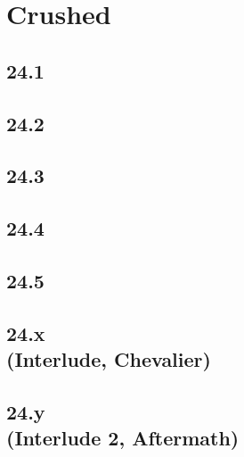 \part{Crushed}
 \chapter{24.1}
 \chapter{24.2}
 \chapter{24.3}
 \chapter{24.4}
 \chapter{24.5}
 \chapter[24.x (Interlude, Chevalier)]{24.x\\(Interlude, Chevalier)}
 \chapter[24.y (Interlude 2, Aftermath)]{24.y\\(Interlude 2, Aftermath)}








